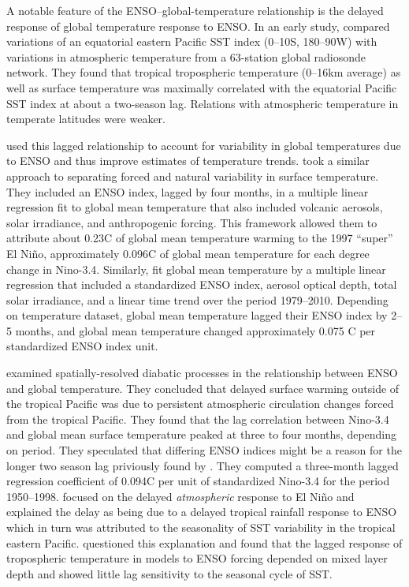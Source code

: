 \documentclass[draft]{agujournal2019}
\begin{document}
A notable feature of the ENSO–global-temperature relationship is the delayed response of global temperature response to ENSO. In an early study,  compared variations of an equatorial eastern Pacific SST index (0--10\textdegree S, 180\textdegree--90\textdegree W) with variations in atmospheric temperature from a 63-station global radiosonde network. They found that tropical tropospheric temperature (0--16km average) as well as surface temperature was maximally correlated with the equatorial Pacific SST index at about a two-season lag.  Relations with atmospheric temperature in temperate latitudes were weaker.

 used this lagged relationship to account for variability in global temperatures due to ENSO and thus improve estimates of temperature trends.  took a similar approach to separating forced and natural variability in surface temperature. They included an ENSO index, lagged by four months, in a multiple linear regression fit to global mean temperature that also included volcanic aerosols, solar irradiance, and anthropogenic forcing. This framework allowed them to attribute about 0.23\textdegree C of global mean temperature warming to the 1997 ``super'' El Ni\~no, approximately 0.096\textdegree C of global mean temperature for each degree change in Nino-3.4. Similarly,  fit global mean temperature by a multiple linear regression that included a standardized ENSO index, aerosol optical depth, total solar irradiance, and a linear time trend over the period 1979--2010. Depending on temperature dataset, global mean temperature lagged their ENSO index by 2--5 months, and global mean temperature changed approximately 0.075 \textdegree C per standardized ENSO index unit.

 examined spatially-resolved diabatic processes in the relationship between ENSO and global temperature. They concluded that delayed surface warming outside of the tropical Pacific was due to persistent atmospheric circulation changes forced from the tropical Pacific. They found that the lag correlation between Nino-3.4 and global mean surface temperature peaked at three to four months, depending on period. They speculated that differing ENSO indices might be a reason for the longer two season lag priviously found by . They computed a three-month lagged regression coefficient of 0.094\textdegree C per unit of standardized Nino-3.4 for the period 1950--1998.  focused on the delayed \textit{atmospheric} response to El Ni\~no and explained the delay as being due to a delayed tropical rainfall response to ENSO which in turn was attributed to the seasonality of SST variability in the tropical eastern Pacific.  questioned this explanation and found that the lagged response of tropospheric temperature in models to ENSO forcing depended on mixed layer depth and showed little lag sensitivity to the seasonal cycle of SST.
\end{document}
